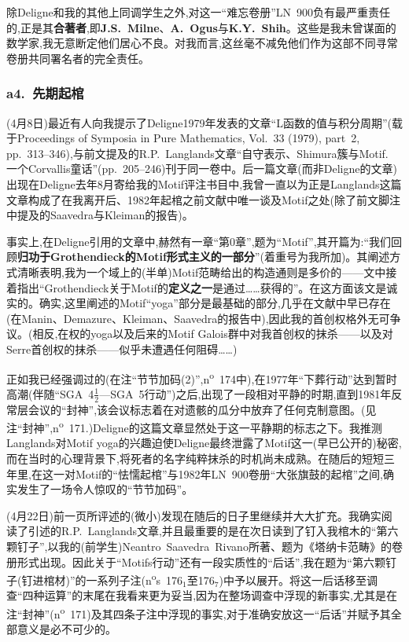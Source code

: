 \dmark{}除Deligne和我的其他上同调学生之外,对这一“难忘卷册”LN~900负有最严重责任的,正是其\textbf{合著者},即\textbf{J.S.~Milne}、\textbf{A.~Ogus}与\textbf{K.Y.~Shih}。这些是我未曾谋面的数学家,我无意断定他们居心不良。对我而言,这丝毫不减免他们作为这部不同寻常卷册共同署名者的完全责任。

\subsubsection*{a4.~先期起棺}


(4月8日)最近有人向我提示了Deligne1979年发表的文章“L函数的值与积分周期”(载于Proceedings of Symposia in Pure Mathematics, Vol.~33 (1979), part~2, pp.~313--346),与前文提及的R.P.~Langlands文章“自守表示、Shimura簇与Motif. 一个Corvallis童话”(pp.~205--246)刊于同一卷中。后一篇文章(而非Deligne的文章)出现在Deligne去年8月寄给我的Motif评注书目中,我曾一直以为正是Langlands这篇文章构成了在我离开后、1982年起棺之前文献中唯一谈及Motif之处(除了前文脚注中提及的Saavedra与Kleiman的报告)。

事实上,在Deligne引用的文章中,赫然有一章“第0章”,题为“Motif”,其开篇为:“我们回顾\textbf{归功于Grothendieck的Motif形式主义的一部分}”(着重号为我所加)。其阐述方式清晰表明,我为一个域上的(半单)Motif范畴给出的构造通则是多价的——文中接着指出“Grothendieck关于Motif的\textbf{定义之一}是通过……获得的”。在这方面该文是诚实的。确实,这里阐述的Motif“yoga”部分是最基础的部分,几乎在文献中早已存在(在Manin、Demazure、Kleiman、Saavedra的报告中),因此我的首创权\dmark{}格外无可争议。(相反,在权的yoga以及后来的Motif Galois群中对我首创权的抹杀——以及对Serre首创权的抹杀——似乎未遭遇任何阻碍……)

正如我已经强调过的(在注“节节加码(2)”,n\textsuperscript{o}~174中),在1977年“下葬行动”达到暂时高潮(伴随“SGA~4$\frac{1}{2}$—SGA~5行动”)之后,出现了一段相对平静的时期,直到1981年反常层会议的“封神”,该会议标志着在对遗骸的瓜分中放弃了任何克制意图。(见注“封神”,n\textsuperscript{o}~171.)Deligne的这篇文章显然处于这一平静期的标志之下。我推测Langlands对Motif yoga的兴趣迫使Deligne最终泄露了Motif这一(早已公开的)秘密,而在当时的心理背景下,将死者的名字纯粹抹杀的时机尚未成熟。在随后的短短三年里,在这一对Motif的“怯懦起棺”与1982年LN~900卷册“大张旗鼓的起棺”之间,确实发生了一场令人惊叹的“节节加码”。

(4月22日)前一页所评述的(微小)发现在随后的日子里继续并大大扩充。我确实阅读了引述的R.P.~Langlands文章,并且最重要的是在次日读到了钉入我棺木的“第六颗钉子”,以我的(前学生)Neantro~Saavedra~Rivano所著、题为《塔纳卡范畴》的卷册形式出现。因此关于“Motifs行动”还有一段实质性的“后话”,我在题为“第六颗钉子(钉进棺材)”的一系列子注(n\textsuperscript{o}s~176$_{1}$至176$_{7}$)中予以展开。将这一后话移至调查“四种运算”的末尾在我看来更为妥当,因为在整场调查中浮现的新事实,尤其是在注“封神”(n\textsuperscript{o}~171)及其四条子注中浮现的事实,对于准确安放这一“后话”并赋予其全部意义是必不可少的。

